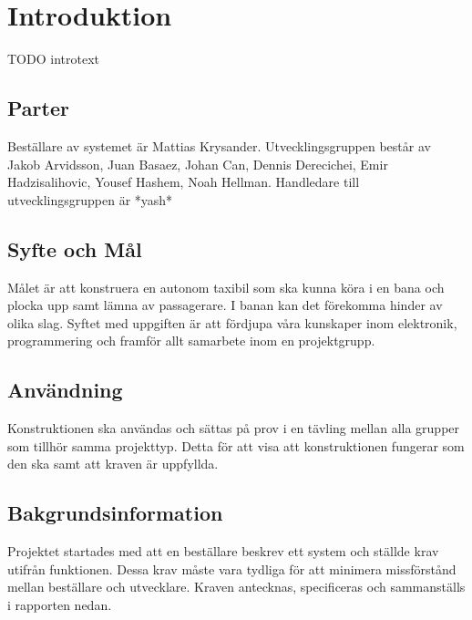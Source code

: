\documentclass[krav.tex]{subfiles}
\begin{document}
\section{Introduktion}
TODO introtext

\subsection{Parter}
Beställare av systemet är Mattias Krysander.  Utvecklingsgruppen består av
Jakob Arvidsson, Juan Basaez, Johan Can, Dennis Derecichei, Emir
Hadzisalihovic, Yousef Hashem, Noah Hellman.  Handledare till
utvecklingsgruppen är *yash*

\subsection{Syfte och Mål}
Målet är att konstruera en autonom taxibil som ska kunna köra i en bana och
plocka upp samt lämna av passagerare. I banan kan det förekomma hinder av olika
slag. Syftet med uppgiften är att fördjupa våra kunskaper inom elektronik,
programmering och framför allt samarbete inom en projektgrupp.

\subsection{Användning}
Konstruktionen ska användas och sättas på prov i en tävling mellan alla grupper som tillhör samma projekttyp. Detta för att visa att konstruktionen fungerar som den ska samt att kraven är uppfyllda.

\subsection{Bakgrundsinformation}
Projektet startades med att en beställare beskrev ett system och ställde krav
utifrån funktionen. Dessa krav måste vara tydliga för att minimera missförstånd
mellan beställare och utvecklare. Kraven antecknas, specificeras och
sammanställs i rapporten nedan.
\end{document}

